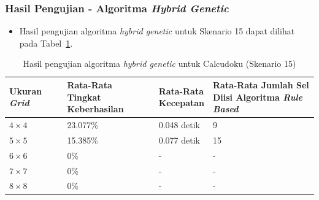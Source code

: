 \documentclass{beamer}
\begin{document}
\begin{frame}
\frametitle{Hasil Pengujian - Algoritma \textit{Hybrid Genetic}}
\begin{itemize}
\item Hasil pengujian algoritma \textit{hybrid genetic} untuk Skenario 15 dapat dilihat pada Tabel~\ref{tab:pengujianhg15}.
\end{itemize}
\begin{table}
\tiny
\centering
\captionsetup{justification=centering}
\caption[Hasil pengujian algoritma \textit{hybrid genetic} untuk Calcudoku (Skenario 15)]{Hasil pengujian algoritma \textit{hybrid genetic} untuk Calcudoku (Skenario 15)}
\begin{tabular}{| l | l | l | l |}
\hline
Ukuran \textit{Grid} & \makecell[c]{Rata-Rata \\ Tingkat Keberhasilan} & \makecell[c]{Rata-Rata \\ Kecepatan} & \makecell[c]{Rata-Rata Jumlah Sel \\ Diisi Algoritma \textit{Rule Based}} \\
\hline \hline
\begin{math}4 \times 4\end{math} & 23.077\% & 0.048 detik & 9 \\
\hline
\begin{math}5 \times 5\end{math} & 15.385\% & 0.077 detik & 15 \\
\hline
\begin{math}6 \times 6\end{math} & 0\% & - & - \\
\hline
\begin{math}7 \times 7\end{math} & 0\% & - & - \\
\hline
\begin{math}8 \times 8\end{math} & 0\% & - & - \\
\hline
\end{tabular}
\label{tab:pengujianhg15}
\end{table}
\end{frame}

\end{document}
